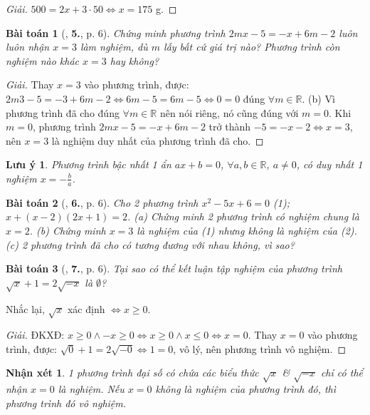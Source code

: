 \documentclass{article}
\numberwithin{equation}{section}
\newtheorem{baitoan}{Bài toán}
\newtheorem{luuy}{Lưu ý}[section]
\newtheorem{nhanxet}{Nhận xét}[section]
\begin{document}
\begin{proof}[Giải]
	$500 = 2x + 3\cdot50\Leftrightarrow x = 175$ g.
\end{proof}

\begin{baitoan}[\cite{SBT_Toan_8_tap_2}, \textbf{5.}, p. 6]
	Chứng minh phương trình $2mx - 5 = -x + 6m - 2$ luôn luôn nhận $x = 3$ làm nghiệm, dù $m$ lấy bất cứ giá trị nào? Phương trình còn nghiệm nào khác $x = 3$ hay không?
\end{baitoan}

\begin{proof}[Giải]
	Thay $x = 3$ vào phương trình, được: $2m3 - 5 = -3 + 6m - 2\Leftrightarrow6m - 5 = 6m - 5\Leftrightarrow0 = 0$ đúng $\forall m\in\mathbb{R}$. (b) Vì phương trình đã cho đúng $\forall m\in\mathbb{R}$ nên nói riêng, nó cũng đúng với $m = 0$. Khi $m = 0$, phương trình $2mx - 5 = -x + 6m - 2$ trở thành $-5 = -x - 2\Leftrightarrow x = 3$, nên $x = 3$ là nghiệm duy nhất của phương trình đã cho.
\end{proof}

\begin{luuy}
	Phương trình bậc nhất 1 ẩn $ax + b = 0$, $\forall a,b\in\mathbb{R}$, $a\ne0$, có duy nhất 1 nghiệm $x = -\frac{b}{a}$.
\end{luuy}

\begin{baitoan}[\cite{SBT_Toan_8_tap_2}, \textbf{6.}, p. 6]
	Cho 2 phương trình $x^2 - 5x + 6 = 0$ (1); $x + (x - 2)(2x + 1) = 2$. (a) Chứng minh 2 phương trình có nghiệm chung là $x = 2$. (b) Chứng minh $x = 3$ là nghiệm của (1) nhưng không là nghiệm của (2). (c) 2 phương trình đã cho có tương đương với nhau không, vì sao?
\end{baitoan}

\begin{baitoan}[\cite{SBT_Toan_8_tap_2}, \textbf{7.}, p. 6]
	Tại sao có thể kết luận tập nghiệm của phương trình $\sqrt{x} + 1 = 2\sqrt{-x}$ là $\emptyset$?
\end{baitoan}
Nhắc lại, $\sqrt{x}$ xác định $\Leftrightarrow x\ge 0$.
\begin{proof}[Giải]
	ĐKXĐ: $x\ge 0\land-x\ge 0\Leftrightarrow x\ge 0\land x\le0\Leftrightarrow x = 0$. Thay $x = 0$ vào phương trình, được: $\sqrt{0} + 1 = 2\sqrt{-0}\Leftrightarrow 1 = 0$, vô lý, nên phương trình vô nghiệm.
\end{proof}

\begin{nhanxet}
	1 phương trình đại số có chứa các biểu thức $\sqrt{x}$ \& $\sqrt{-x}$ chỉ có thể nhận $x = 0$ là nghiệm. Nếu $x = 0$ không là nghiệm của phương trình đó, thì phương trình đó vô nghiệm.
\end{nhanxet}
\end{document}
